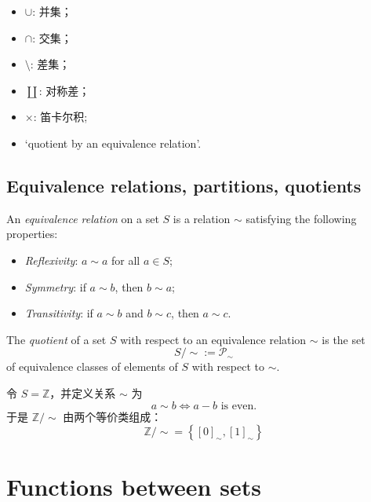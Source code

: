 \begin{itemize}
    \item \(\cup\): 并集；
    \item \(\cap\): 交集；
    \item \(\setminus\): 差集；
    \item \(\coprod\): 对称差；
    \item \(\times\): 笛卡尔积;
    \item `quotient by an equivalence relation'.
\end{itemize}

\subsection{Equivalence relations, partitions, quotients}\label{sec:1.1.4}

\begin{definition}\label{def:equivalence_relation}
    An \emph{equivalence relation} on a set \(S\) is a relation \(\sim\) satisfying the following properties:
    \begin{itemize}
        \item \emph{Reflexivity}: \(a \sim a\) for all \(a \in S\);
        \item \emph{Symmetry}: if \(a \sim b\), then \(b \sim a\);
        \item \emph{Transitivity}: if \(a \sim b\) and \(b \sim c\), then \(a \sim c\).
    \end{itemize}
\end{definition}

\begin{definition}[Quotient]\label{def:quotient}
    The \emph{quotient} of a set \(S\) with respect to an equivalence relation \(\sim\) is the set
    \[
        S / \sim := \mathscr{P}_{\sim }
    \]
    of equivalence classes of elements of \(S\) with respect to \(\sim\).
\end{definition}
\begin{eg}\label{eg:1.1.3}
    令 \(S = \mathbb{Z}\)，并定义关系 \(\sim \) 为
    \[
        a \sim b \iff a - b \text{ is even}.
    \]
    于是 \(\mathbb{Z} / \sim \) 由两个等价类组成：
    \[\mathbb{Z} / \sim  = \left\{[0]_{\sim }, [1]_{\sim } \right\}\]
\end{eg}

\section{Functions between sets}\label{1.2}


